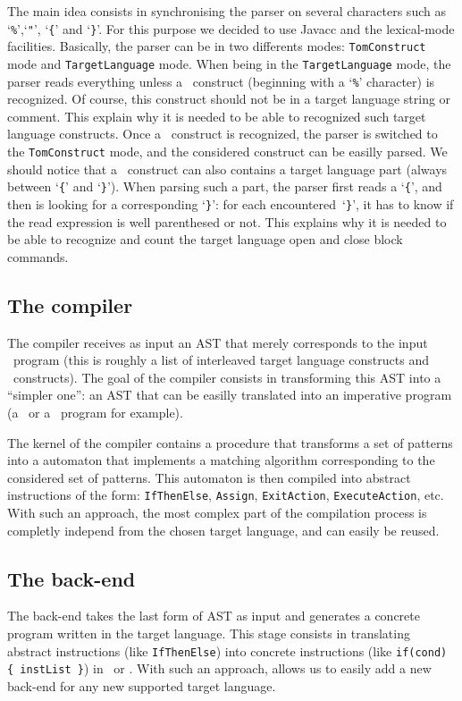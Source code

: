 The main idea consists in synchronising the parser on several
characters such as `\texttt{\%}',`\texttt{"}', `\texttt{\{}' and
`\texttt{\}}'. For this purpose we decided to use \textsf{Javacc} and
the lexical-mode facilities. Basically, the parser can be in two
differents modes: \texttt{TomConstruct} mode and
\texttt{TargetLanguage} mode.
When being in the \texttt{TargetLanguage} mode, the parser reads
everything unless a \TOM\ construct (beginning with a `\texttt{\%}'
character) is recognized. Of course, this construct should not be in a
target language string or comment. This explain why it is needed to be
able to recognized such target language constructs.
Once a \TOM\ construct is recognized, the parser is switched to the
\texttt{TomConstruct} mode, and the considered construct can be
easilly parsed. 
We should notice that a \TOM\ construct can also contains a target
language part (always between `\texttt{\{}' and `\texttt{\}}').
When parsing such a part, the parser first reads a `\texttt{\{}', and
then is looking for a corresponding `\texttt{\}}': for each
encountered~`\texttt{\}}', it has to know if the read expression is
well parenthesed or not. This explains why it is needed to be able to
recognize and count the target language open and close block
commands. 

\subsection{The compiler}
The compiler receives as input an AST that merely corresponds to the 
input \TOM\ program (this is roughly a list of interleaved target
language constructs and \TOM\ constructs).
The goal of the compiler consists in transforming this AST into a
``simpler one'': an AST that can be easilly translated into an
imperative program (a \Clang\ or a \Java\ program for example).

The kernel of the compiler contains a procedure that transforms a set
of patterns into a automaton that implements a matching algorithm
corresponding to the considered set of patterns. 
This automaton is then compiled into abstract instructions of the
form: \texttt{IfThenElse}, \texttt{Assign}, \texttt{ExitAction}, 
\texttt{ExecuteAction}, etc. 
With such an approach, the most complex part of the compilation process
is completly independ from the chosen target language, and can easily
be reused.


\subsection{The back-end}
The back-end takes the last form of AST as input and generates a
concrete program written in the target language. This stage consists
in translating abstract instructions (like \texttt{IfThenElse}) into
concrete instructions (like \texttt{if(cond) \{ instList \}}) in \Clang\
or \Java.  
With such an approach, allows us to easily add a new back-end for any 
new supported target language.


